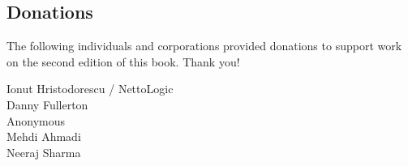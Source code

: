 \subsection*{Donations}

The following individuals and corporations provided donations
to support work on the second edition of this book.  Thank you!

Ionut Hristodorescu / NettoLogic \\
Danny Fullerton \\
Anonymous \\
Mehdi Ahmadi \\
Neeraj Sharma

